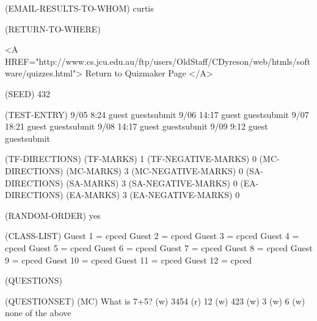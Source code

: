 
(EMAIL-RESULTS-TO-WHOM) curtis

(RETURN-TO-WHERE) 
\begin{rawhtml}
  <A HREF="http://www.cs.jcu.edu.au/ftp/users/OldStaff/CDyreson/web/htmls/software/quizzes.html">
  Return to Quizmaker Page 
  </A>
\end{rawhtml}

(SEED) 432

(TEST-ENTRY)  
9/05    8:24   guest     guestsubmit
9/06   14:17   guest     guestsubmit 
9/07   18:21   guest     guestsubmit 
9/08   14:17   guest     guestsubmit
9/09    9:12   guest     guestsubmit

(TF-DIRECTIONS) 
(TF-MARKS) 1
(TF-NEGATIVE-MARKS) 0
(MC-DIRECTIONS) 
(MC-MARKS) 3
(MC-NEGATIVE-MARKS) 0
(SA-DIRECTIONS) 
(SA-MARKS) 3
(SA-NEGATIVE-MARKS) 0
(EA-DIRECTIONS) 
(EA-MARKS) 3
(EA-NEGATIVE-MARKS) 0

(RANDOM-ORDER) yes

(CLASS-LIST) 
Guest 1 = cpced
Guest 2 = cpced
Guest 3 = cpced
Guest 4 = cpced
Guest 5 = cpced
Guest 6 = cpced
Guest 7 = cpced
Guest 8 = cpced
Guest 9 = cpced
Guest 10 = cpced
Guest 11 = cpced
Guest 12 = cpced

(QUESTIONS) 

(QUESTIONSET)
(MC) What is 7+5?
(w) 3454
(r) 12
(w) 423
(w) 3
(w) 6
(w) none of the above

